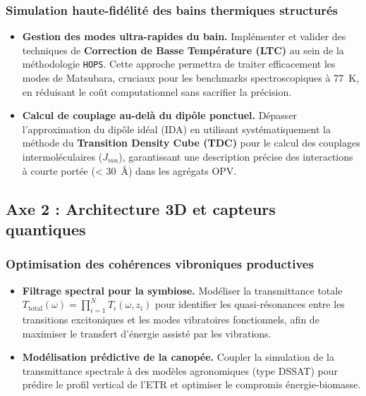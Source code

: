 \documentclass[12pt, a4paper]{article}
\begin{document}
\subsubsection{Simulation haute-fidélité des bains thermiques structurés}
\begin{itemize}
    \item \textbf{Gestion des modes ultra-rapides du bain.} Implémenter et valider des techniques de \textbf{Correction de Basse Température (LTC)} au sein de la méthodologie \texttt{HOPS}. Cette approche permettra de traiter efficacement les modes de Matsubara, cruciaux pour les benchmarks spectroscopiques à \SI{77}{\kelvin}, en réduisant le coût computationnel sans sacrifier la précision.
    \item \textbf{Calcul de couplage au-delà du dipôle ponctuel.} Dépasser l'approximation du dipôle idéal (IDA) en utilisant systématiquement la méthode du \textbf{Transition Density Cube (TDC)} pour le calcul des couplages intermoléculaires ($J_{mn}$), garantissant une description précise des interactions à courte portée (< \SI{30}{\angstrom}) dans les agrégats OPV.
\end{itemize}

\subsection{Axe 2 : Architecture 3D et capteurs quantiques}
\subsubsection{Optimisation des cohérences vibroniques productives}
\begin{itemize}
    \item \textbf{Filtrage spectral pour la symbiose.} Modéliser la transmittance totale $T_{\text{total}}(\omega) = \prod_{i=1}^N T_i(\omega, z_i)$ pour identifier les quasi-résonances entre les transitions excitoniques et les modes vibratoires fonctionnels, afin de maximiser le transfert d'énergie assisté par les vibrations.
    \item \textbf{Modélisation prédictive de la canopée.} Coupler la simulation de la transmittance spectrale à des modèles agronomiques (type DSSAT) pour prédire le profil vertical de l'ETR et optimiser le compromis énergie-biomasse.
\end{itemize}
\end{document}
